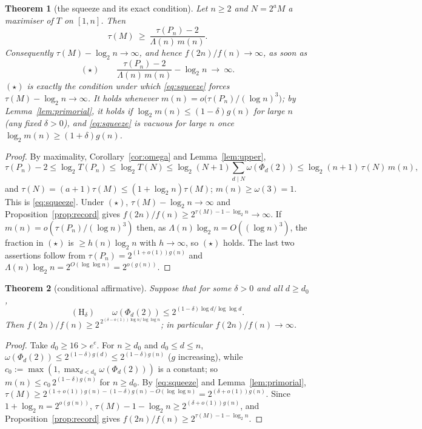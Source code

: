 \documentclass[11pt]{article}
\newtheorem{theorem}{Theorem}
\theoremstyle{remark}
\begin{document}
\begin{theorem}[the squeeze and its exact condition]\label{thm:squeeze}
Let $n\ge2$ and $N=2^aM$ a maximiser of $T$ on $[1,n]$. Then
\begin{equation}\label{eq:squeeze}
  \tau(M)\ \ge\ \frac{\tau(P_n)-2}{\Lambda(n)\,m(n)} .
\end{equation}
Consequently $\tau(M)-\log_2n\to\infty$, and hence $f(2n)/f(n)\to\infty$, as soon as
\[
  (\star)\qquad \frac{\tau(P_n)-2}{\Lambda(n)\,m(n)}-\log_2n\ \longrightarrow\ \infty .
\]
$(\star)$ is exactly the condition under which \eqref{eq:squeeze} forces
$\tau(M)-\log_2n\to\infty$. It holds whenever $m(n)=o\big(\tau(P_n)/(\log n)^3\big)$; by
Lemma~\ref{lem:primorial}, it holds if $\log_2m(n)\le(1-\delta)g(n)$ for large $n$ (any fixed
$\delta>0$), and \eqref{eq:squeeze} is vacuous for large $n$ once $\log_2 m(n)\ge(1+\delta)g(n)$.
\end{theorem}
\begin{proof}
By maximality, Corollary~\ref{cor:omega} and Lemma~\ref{lem:upper},
\[
  \tau(P_n)-2\le\log_2T(P_n)\le\log_2T(N)\le\log_2(N+1)\sum_{d\mid N}\omega(\Phi_d(2))
  \le\log_2(n+1)\,\tau(N)\,m(n),
\]
and $\tau(N)=(a+1)\tau(M)\le(1+\log_2n)\tau(M)$; $m(n)\ge\omega(3)=1$. This is
\eqref{eq:squeeze}. Under $(\star)$, $\tau(M)-\log_2n\to\infty$ and
Proposition~\ref{prop:record} gives $f(2n)/f(n)\ge2^{\tau(M)-1-\log_2n}\to\infty$. If
$m(n)=o(\tau(P_n)/(\log n)^3)$ then, as $\Lambda(n)\log_2n=O((\log n)^3)$, the fraction in
$(\star)$ is $\ge h(n)\log_2n$ with $h\to\infty$, so $(\star)$ holds. The last two assertions follow
from $\tau(P_n)=2^{(1+o(1))g(n)}$ and $\Lambda(n)\log_2 n=2^{O(\log\log n)}=2^{o(g(n))}$.
\end{proof}

\begin{theorem}[conditional affirmative]\label{thm:cond}
Suppose that for some $\delta>0$ and all $d\ge d_0$,
\[
  (\mathrm H_\delta)\qquad \omega(\Phi_d(2))\le2^{(1-\delta)\log d/\log\log d}.
\]
Then $f(2n)/f(n)\ge2^{\,2^{(\delta-o(1))\log n/\log\log n}}$; in particular $f(2n)/f(n)\to\infty$.
\end{theorem}
\begin{proof}
Take $d_0\ge16>e^e$. For $n\ge d_0$ and $d_0\le d\le n$,
$\omega(\Phi_d(2))\le2^{(1-\delta)g(d)}\le2^{(1-\delta)g(n)}$ ($g$ increasing), while
$c_0:=\max(1,\max_{d<d_0}\omega(\Phi_d(2)))$ is a constant; so $m(n)\le c_0\,2^{(1-\delta)g(n)}$
for $n\ge d_0$. By \eqref{eq:squeeze} and Lemma~\ref{lem:primorial},
$\tau(M)\ge2^{(1+o(1))g(n)-(1-\delta)g(n)-O(\log\log n)}=2^{(\delta+o(1))g(n)}$. Since
$1+\log_2n=2^{o(g(n))}$, $\tau(M)-1-\log_2n\ge2^{(\delta+o(1))g(n)}$, and
Proposition~\ref{prop:record} gives $f(2n)/f(n)\ge2^{\tau(M)-1-\log_2n}$.
\end{proof}
\end{document}
